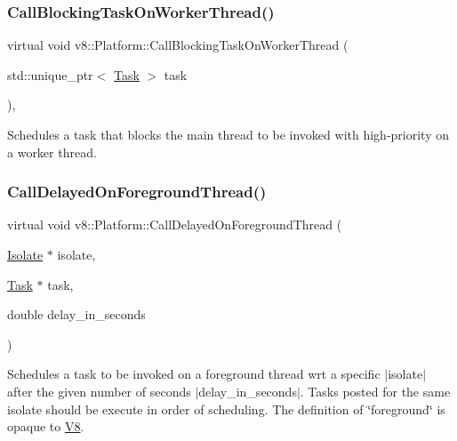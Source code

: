 \subsubsection{\texorpdfstring{Call\+Blocking\+Task\+On\+Worker\+Thread()}{CallBlockingTaskOnWorkerThread()}}
{\footnotesize\ttfamily virtual void v8\+::\+Platform\+::\+Call\+Blocking\+Task\+On\+Worker\+Thread (\begin{DoxyParamCaption}\item[{std\+::unique\+\_\+ptr$<$ \mbox{\hyperlink{classv8_1_1Task}{Task}} $>$}]{task }\end{DoxyParamCaption})\hspace{0.3cm}{\ttfamily [inline]}, {\ttfamily [virtual]}}

Schedules a task that blocks the main thread to be invoked with high-\/priority on a worker thread. \mbox{\label{classv8_1_1Platform_a72bff12d95fbf2118279b0e8f53f8a4b}} 
\subsubsection{\texorpdfstring{Call\+Delayed\+On\+Foreground\+Thread()}{CallDelayedOnForegroundThread()}}
{\footnotesize\ttfamily virtual void v8\+::\+Platform\+::\+Call\+Delayed\+On\+Foreground\+Thread (\begin{DoxyParamCaption}\item[{\mbox{\hyperlink{classv8_1_1Isolate}{Isolate}} $\ast$}]{isolate,  }\item[{\mbox{\hyperlink{classv8_1_1Task}{Task}} $\ast$}]{task,  }\item[{double}]{delay\+\_\+in\+\_\+seconds }\end{DoxyParamCaption})\hspace{0.3cm}{\ttfamily [pure virtual]}}

Schedules a task to be invoked on a foreground thread wrt a specific $\vert$isolate$\vert$ after the given number of seconds $\vert$delay\+\_\+in\+\_\+seconds$\vert$. Tasks posted for the same isolate should be execute in order of scheduling. The definition of \char`\"{}foreground\char`\"{} is opaque to \mbox{\hyperlink{classv8_1_1V8}{V8}}. \mbox{\label{classv8_1_1Platform_a808b0e55ed3efca10ebca031bbd6ecc6}} 

